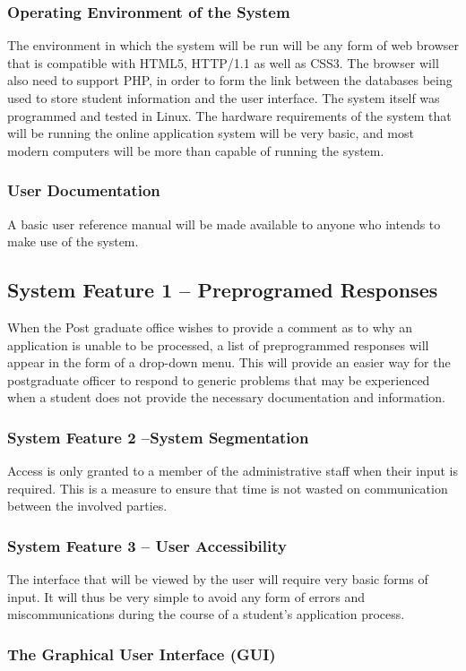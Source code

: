 \documentclass[journal]{IEEEtran}
\begin{document}
\hfill \break \subsubsection{Operating Environment of the System}
The environment in which the system will be run will be any form of web browser that is compatible with HTML5, HTTP/1.1 as well as CSS3. The browser will also need to support PHP, in order to form the link between the databases being used to store student information and the user interface. The system itself was programmed and tested in Linux. The hardware requirements of the system that will be running the online application system will be very basic, and most modern computers will be more than capable of running the system.
\hfill \break \subsubsection{User Documentation}
A basic user reference manual will be made available to anyone who intends to make use of the system.
\hfill \break \subsection{System Feature 1 – Preprogramed Responses}
When the Post graduate office wishes to provide a comment as to why an application is unable to be processed, a list of preprogrammed responses will appear in the form of a drop-down menu. This will provide an easier way for the postgraduate officer to respond to generic problems that may be experienced when a student does not provide the necessary documentation and information.
\hfill \break \subsubsection{System Feature 2 –System Segmentation}
Access is only granted to a member of the administrative staff when their input is required. This is a measure to ensure that time is not wasted on communication between the involved parties.
\hfill \break \subsubsection{System Feature 3 – User Accessibility}
The interface that will be viewed by the user will require very basic forms of input. It will thus be very simple to avoid any form of errors and miscommunications during the course of a student's application process.
\hfill \break \subsubsection{The Graphical User Interface (GUI)}
\end{document}
